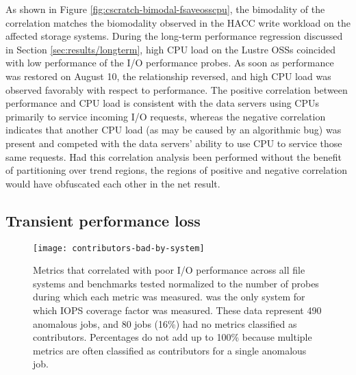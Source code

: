 As shown in Figure \ref{fig:cscratch-bimodal-fsaveosscpu}, the bimodality of the correlation matches the biomodality observed in the HACC write workload on the affected storage systems.
During the long-term performance regression discussed in Section \ref{sec:results/longterm}, high CPU load on the Lustre OSSs coincided with low performance of the I/O performance probes.
As soon as performance was restored on August 10, the relationship reversed, and high CPU load was observed favorably with respect to performance.
The positive correlation between performance and CPU load is consistent with the data servers using CPUs primarily to service incoming I/O requests, whereas the negative correlation indicates that another CPU load (as may be caused by an algorithmic bug) was present and competed with the data servers' ability to use CPU to service those same requests.
Had this correlation analysis been performed without the benefit of partitioning over trend regions, the regions of positive and negative correlation would have obfuscated each other in the net result. 


\subsection{Transient performance loss} \label{sec:results/shortterm}



\begin{figure}
    \centering
    \texttt{[image: contributors-bad-by-system]}
    \vspace{-.35in}
    \caption{Metrics that correlated with poor I/O performance across all file systems and benchmarks tested normalized to the number of probes during which each metric was measured.
    \mira was the only system for which IOPS coverage factor was measured. 
    These data represent 490 anomalous jobs, and 80 jobs (16\%) had no metrics classified as contributors.
    Percentages do not add up to 100\% because multiple metrics are often classified as contributors for a single anomalous job.
    }
    \label{fig:contributors-bad-by-system}
\end{figure}

